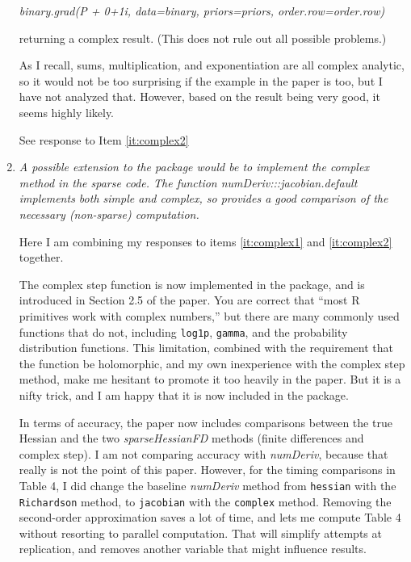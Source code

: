 \documentclass{article}
\newcommand{\pkg}[1]{\emph{#1}}
\newcommand{\code}[1]{\texttt{#1}}
\newcommand{\func}[1]{\code{#1}}
\newcommand{\class}[1]{\textsl{#1}}
\newcommand{\method}[1]{\func{#1}}
\newenvironment{revQuote}{\itshape}{\vspace{\baselineskip}}
\newenvironment{response}{\normalfont}{\vspace{\baselineskip}}
\begin{document}
\begin{enumerate}[align=left]
\begin{revQuote}
binary.grad(P + 0+1i, data=binary, priors=priors, order.row=order.row)

returning a complex result. (This does not rule out all possible problems.)

As I recall, sums, multiplication, and exponentiation are all complex
analytic, so it would not be too surprising if the example in the paper is
too, but I have not analyzed that. However, based on the result being very
good, it seems highly likely.
  \end{revQuote}

  \begin{response}
    See response to Item \ref{it:complex2}
  \end{response}


\item\label{it:complex2} \begin{revQuote}
A possible extension to the package would be to implement the complex
method in the sparse code. The function numDeriv:::jacobian.default
implements both simple and complex, so provides a good comparison of the
necessary (non-sparse) computation. 

  \end{revQuote}

\begin{response}

Here I am combining my responses to items \ref{it:complex1} and
\ref{it:complex2} together.

  The complex step function is now implemented in the package, and is
  introduced in Section 2.5 of the paper.  You
  are correct that ``most R primitives work with complex numbers,''
  but there are many commonly used functions that do not, including 
  \func{log1p}, \func{gamma}, and the probability distribution
  functions. This limitation, combined with the requirement that the function be
  holomorphic, and my own inexperience with the complex step method, make
  me hesitant to promote it too heavily in the paper. But it is a nifty
  trick, and I am happy that it is now included in the package.
 
In terms of accuracy, the paper now includes comparisons between the true
Hessian and the two \class{sparseHessianFD} methods (finite differences
and complex step). I am not comparing accuracy with \pkg{numDeriv},
because that really is not the point of this paper.  However, for the
timing comparisons in Table 4, I did
change the baseline \pkg{numDeriv} method from \func{hessian} with the
\method{Richardson} method, to \func{jacobian} with the
\method{complex} method. Removing the second-order approximation saves
a lot of time, and lets me compute Table 4 without resorting to
parallel computation. That will simplify attempts at replication, and
removes another variable that might influence results.


\end{response}
\end{enumerate}
\end{document}
